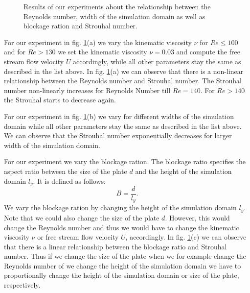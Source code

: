 \documentclass[a4paper,11pt, footsepline]{book}
\begin{document}
\begin{figure}
  \begin{center}
   \caption{Results of our experiments about the relationship between the Reynolds number, width of the simulation domain as well as blockage ration and Strouhal number.}
  \label{fig:vonKarmanExperiments}
  \end{center}
\end{figure}

For our experiment in fig. \ref{fig:vonKarmanExperiments}(a) we vary the kinematic viscosity $\nu$ for $Re\leq 100$ and for $Re>130$ we set the kinematic viscosity $\nu=0.03$ and compute the free stream flow velocity $U$ accordingly, while all other parameters stay the same as described in the list above.
In fig. \ref{fig:vonKarmanExperiments}(a) we can observe that there is a non-linear relationship between the Reynolds number and Strouhal number. The Strouhal number non-linearly increases for Reynolds Number till $Re=140$. For $Re>140$ the Strouhal starts to decrease again.

For our experiment in fig. \ref{fig:vonKarmanExperiments}(b) we vary for different widths of the simulation domain while all other parameters stay the same as described in the list above. We can observe that the Strouhal number exponentially decreases for larger width of the simulation domain.

For our experiment we vary the blockage ration. The blockage ratio specifies the aspect ratio between the size of the plate $d$ and the height of the simulation domain $l_y$. It is defined as follows:
\begin{equation}
\label{eq-strouhal}
B=\frac{d}{l_y}.
\end{equation}
We vary the blockage ration by changing the height of the simulation domain $l_y$. Note that we could also change the size of the plate $d$. However, this would change the Reynolds number and thus we would have to change the kinematic viscosity $\nu$ or free stream flow velocity $U$, accordingly.
In fig. \ref{fig:vonKarmanExperiments}(c) we can observe that there is a linear relationship between the blockage ratio and Strouhal number. Thus if we change the size of the plate when we for example change the Reynolds number of we change the height of the simulation domain we have to proportionally change the height of the simulation domain or size of the plate, respectively.
\end{document}
